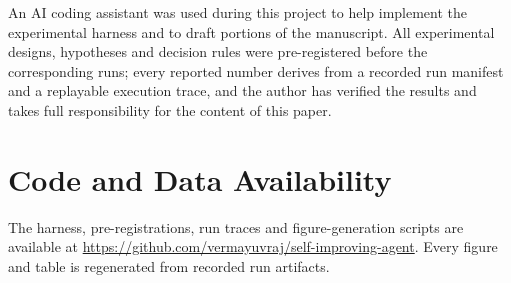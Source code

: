 \documentclass{article}
\begin{document}
An AI coding assistant was used during this project to help implement the
experimental harness and to draft portions of the manuscript. All experimental
designs, hypotheses and decision rules were pre-registered before the
corresponding runs; every reported number derives from a recorded run manifest
and a replayable execution trace, and the author has verified the results and
takes full responsibility for the content of this paper.

\section*{Code and Data Availability}

The harness, pre-registrations, run traces and figure-generation scripts are
available at
\url{https://github.com/vermayuvraj/self-improving-agent}.
Every figure and table is regenerated from recorded run artifacts.



\end{document}
